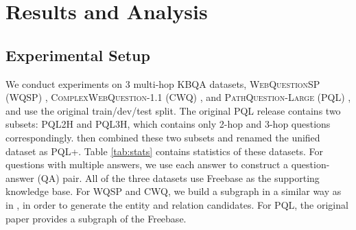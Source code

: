 \section{Results and Analysis}

\subsection{Experimental Setup}
We conduct experiments on 3 multi-hop KBQA datasets, \textsc{WebQuestionSP} (WQSP) \cite{DBLP:conf/acl/YihCHG15}, \textsc{ComplexWebQuestion}-1.1 (CWQ) \cite{DBLP:journals/corr/abs-1807-09623}, and \textsc{PathQuestion-Large} (PQL) \cite{DBLP:conf/coling/ZhouHZ18}, and use the original train/dev/test split. The original PQL release contains two subsets: PQL2H and PQL3H, which contains only 2-hop and 3-hop questions correspondingly.  then combined these two subsets and renamed the unified dataset as PQL+. Table \ref{tab:stats} contains statistics of these datasets. For questions with multiple answers, we use each answer to construct a question-answer (QA) pair. All of the three datasets use Freebase \cite{freebase:datadumps} as the supporting knowledge base. For WQSP and CWQ, we build a subgraph in a similar way as in \cite{DBLP:conf/emnlp/SunDZMSC18}, in order to generate the entity and relation candidates. For PQL, the original paper provides a subgraph of the Freebase. 

\begin{table}[h]\centering
{}
\caption{\fontsize{10}{12}\selectfont Statistics of the datasets. %
}\label{tab:stats}
\end{table}

